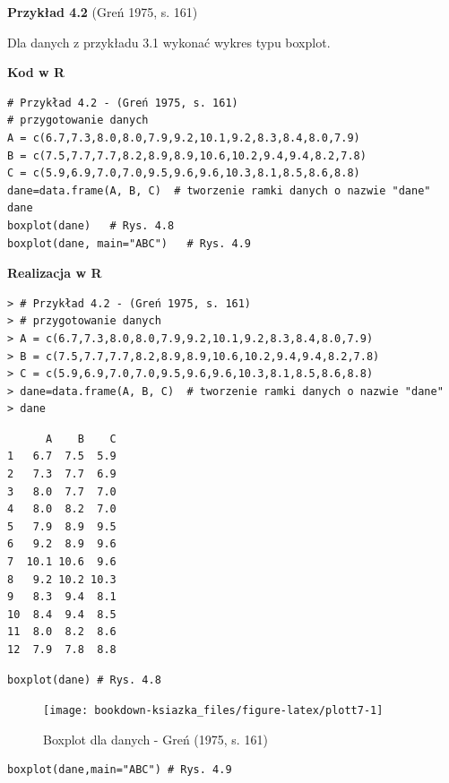 \documentclass[12pt,B5paper,]{book}
\begin{document}
\textbf{Przykład 4.2} (Greń 1975, s. 161)

Dla danych z przykładu 3.1 wykonać wykres typu boxplot.

\vspace{0.8cm}

\textbf{Kod w R}

\begin{verbatim}
# Przykład 4.2 - (Greń 1975, s. 161)
# przygotowanie danych
A = c(6.7,7.3,8.0,8.0,7.9,9.2,10.1,9.2,8.3,8.4,8.0,7.9)
B = c(7.5,7.7,7.7,8.2,8.9,8.9,10.6,10.2,9.4,9.4,8.2,7.8)
C = c(5.9,6.9,7.0,7.0,9.5,9.6,9.6,10.3,8.1,8.5,8.6,8.8)
dane=data.frame(A, B, C)  # tworzenie ramki danych o nazwie "dane"
dane
boxplot(dane)   # Rys. 4.8
boxplot(dane, main="ABC")   # Rys. 4.9
\end{verbatim}

\vspace{0.8cm} \textbf{Realizacja w R}

\begin{verbatim}
> # Przykład 4.2 - (Greń 1975, s. 161)
> # przygotowanie danych
> A = c(6.7,7.3,8.0,8.0,7.9,9.2,10.1,9.2,8.3,8.4,8.0,7.9)
> B = c(7.5,7.7,7.7,8.2,8.9,8.9,10.6,10.2,9.4,9.4,8.2,7.8)
> C = c(5.9,6.9,7.0,7.0,9.5,9.6,9.6,10.3,8.1,8.5,8.6,8.8)
> dane=data.frame(A, B, C)  # tworzenie ramki danych o nazwie "dane"
> dane
\end{verbatim}

\begin{verbatim}
      A    B    C
1   6.7  7.5  5.9
2   7.3  7.7  6.9
3   8.0  7.7  7.0
4   8.0  8.2  7.0
5   7.9  8.9  9.5
6   9.2  8.9  9.6
7  10.1 10.6  9.6
8   9.2 10.2 10.3
9   8.3  9.4  8.1
10  8.4  9.4  8.5
11  8.0  8.2  8.6
12  7.9  7.8  8.8
\end{verbatim}

\begin{verbatim}
boxplot(dane) # Rys. 4.8
\end{verbatim}

\begin{figure}[H]

{\centering \texttt{[image: bookdown-ksiazka\_files/figure-latex/plott7-1]} 

}

\caption{Boxplot dla danych - Greń (1975, s. 161)}\label{fig:plott7}
\end{figure}

\begin{verbatim}
boxplot(dane,main="ABC") # Rys. 4.9
\end{verbatim}
\end{document}
